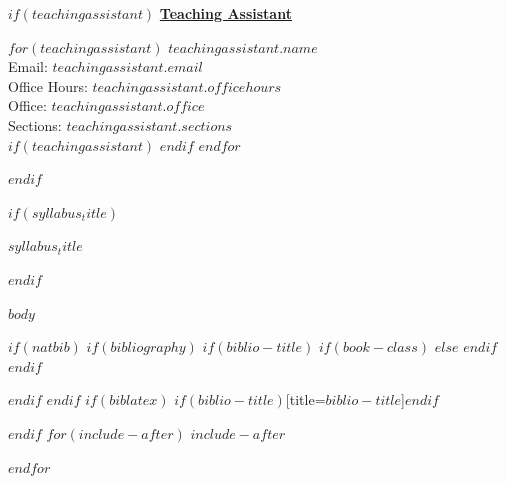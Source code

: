\documentclass[$if(fontsize)$$fontsize$,$endif$$if(lang)$$babel-lang$,$endif$$if(papersize)$$papersize$,$endif$$for(classoption)$$classoption$$sep$,$endfor$]{article}
\begin{document}
$if(teachingassistant)$
\noindent\textbf{\underline{Teaching Assistant}}
  \begin{multicols}{2}
$for(teachingassistant)$
  \noindent\textbf{$teachingassistant.name$}\\
  Email: $teachingassistant.email$\\
  Office Hours: $teachingassistant.officehours$\\
  Office: $teachingassistant.office$\\
  Sections: $teachingassistant.sections$\\
  $if(teachingassistant)$
  \columnbreak
  $endif$
$endfor$
\end{multicols}

	$endif$
\vspace{2mm}

$if(syllabus_title)$
\begin{center}
\textbf{\Large{\textcolor{unhtext}{$syllabus_title$}}}
\end{center}
 $endif$
  
$body$

$if(natbib)$
$if(bibliography)$
$if(biblio-title)$
$if(book-class)$
\renewcommand\bibname{$biblio-title$}
$else$
\renewcommand\refname{$biblio-title$}
$endif$
$endif$


$endif$
$endif$
$if(biblatex)$
\printbibliography$if(biblio-title)$[title=$biblio-title$]$endif$




$endif$
$for(include-after)$
$include-after$

$endfor$
\end{document}
